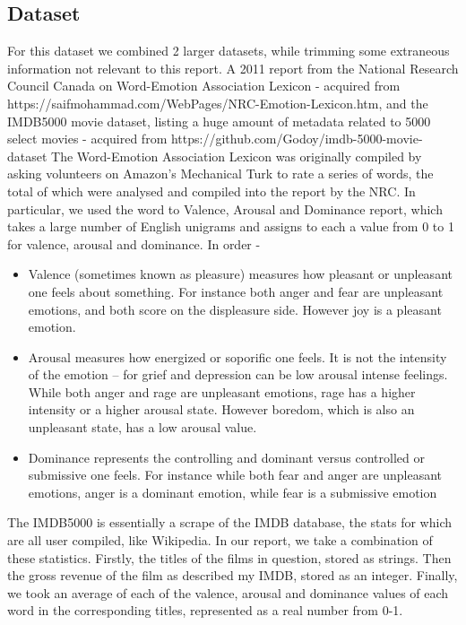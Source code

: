\documentclass[font=10pt]{article}
\begin{document}
    \subsection{Dataset}
    For this dataset we combined 2 larger datasets, while trimming some extraneous information not relevant to this report. A 2011 report from the National Research Council Canada on Word-Emotion Association Lexicon - acquired from https://saifmohammad.com/WebPages/NRC-Emotion-Lexicon.htm, and the IMDB5000 movie dataset, listing a huge amount of metadata related to 5000 select movies - acquired from https://github.com/Godoy/imdb-5000-movie-dataset
    \newline
    The Word-Emotion Association Lexicon was originally compiled by asking volunteers on Amazon's Mechanical Turk to rate a series of words, the total of which were analysed and compiled into the report by the NRC. In particular, we used the word to Valence, Arousal and Dominance report, which takes a large number of English unigrams and assigns to each a value from 0 to 1 for valence, arousal and dominance. In order -

    \begin{itemize}
        \item Valence (sometimes known as pleasure) measures how pleasant or unpleasant one feels about something. For instance both anger and fear are unpleasant emotions, and both score on the displeasure side. However joy is a pleasant emotion.
        \item Arousal measures how energized or soporific one feels. It is not the intensity of the emotion -- for grief and depression can be low arousal intense feelings. While both anger and rage are unpleasant emotions, rage has a higher intensity or a higher arousal state. However boredom, which is also an unpleasant state, has a low arousal value.
        \item Dominance represents the controlling and dominant versus controlled or submissive one feels. For instance while both fear and anger are unpleasant emotions, anger is a dominant emotion, while fear is a submissive emotion
    \end{itemize}

    The IMDB5000 is essentially a scrape of the IMDB database, the stats for which are all user compiled, like Wikipedia.
    \newline
    In our report, we take a combination of these statistics. Firstly, the titles of the films in question, stored as strings. Then the gross revenue of the film as described my IMDB, stored as an integer. Finally, we took an average of each of the valence, arousal and dominance values of each word in the corresponding titles, represented as a real number from 0-1.
    \newline
\end{document}
